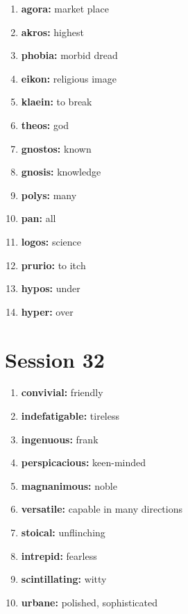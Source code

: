 \documentclass{article}
\begin{document}
\begin{enumerate}
    \item \textbf{agora: }{market place}
    \item \textbf{akros: }{highest}
    \item \textbf{phobia: }{morbid dread}
    \item \textbf{eikon: }{religious image}
    \item \textbf{klaein: }{to break}
    \item \textbf{theos: }{god}
    \item \textbf{gnostos: }{known}
    \item \textbf{gnosis: }{knowledge}
    \item \textbf{polys: }{many}
    \item \textbf{pan: }{all}
    \item \textbf{logos: }{science}
    \item \textbf{prurio: }{to itch}
    \item \textbf{hypos: }{under}
    \item \textbf{hyper: }{over}
    
\end{enumerate}

\section{Session 32}
\begin{enumerate}
    \item \textbf{convivial: }{friendly}
    \item \textbf{indefatigable: }{tireless}
    \item \textbf{ingenuous: }{frank}
    \item \textbf{perspicacious: }{keen-minded}
    \item \textbf{magnanimous: }{noble}
    \item \textbf{versatile: }{capable in many directions}
    \item \textbf{stoical: }{unflinching}
    \item \textbf{intrepid: }{fearless}
    \item \textbf{scintillating: }{witty}
    \item \textbf{urbane: }{polished, sophisticated}
    
\end{enumerate}
\end{document}
